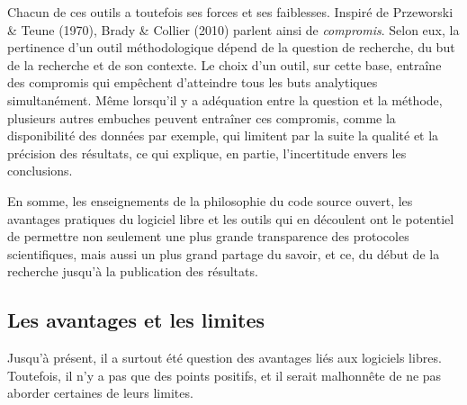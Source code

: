 \documentclass[
  letterpaper,
  DIV=11,
  numbers=noendperiod,
  oneside]{scrreprt}
\begin{document}
Chacun de ces outils a toutefois ses forces et ses faiblesses. Inspiré
de Przeworski \& Teune (1970), Brady \& Collier (2010) parlent ainsi de
\emph{compromis}. Selon eux, la pertinence d'un outil méthodologique
dépend de la question de recherche, du but de la recherche et de son
contexte. Le choix d'un outil, sur cette base, entraîne des compromis
qui empêchent d'atteindre tous les buts analytiques simultanément. Même
lorsqu'il y a adéquation entre la question et la méthode, plusieurs
autres embuches peuvent entraîner ces compromis, comme la disponibilité
des données par exemple, qui limitent par la suite la qualité et la
précision des résultats, ce qui explique, en partie, l'incertitude
envers les conclusions.

En somme, les enseignements de la philosophie du code source ouvert, les
avantages pratiques du logiciel libre et les outils qui en découlent ont
le potentiel de permettre non seulement une plus grande transparence des
protocoles scientifiques, mais aussi un plus grand partage du savoir, et
ce, du début de la recherche jusqu'à la publication des résultats.

\hypertarget{les-avantages-et-les-limites}{%
\subsection{Les avantages et les
limites}\label{les-avantages-et-les-limites}}

Jusqu'à présent, il a surtout été question des avantages liés aux
logiciels libres. Toutefois, il n'y a pas que des points positifs, et il
serait malhonnête de ne pas aborder certaines de leurs limites.
\end{document}
